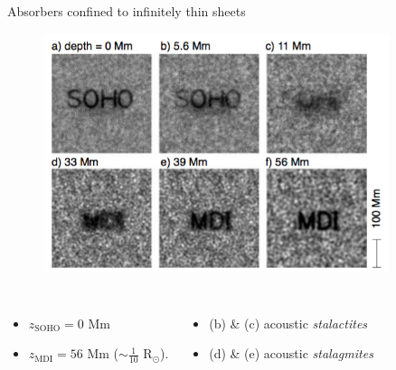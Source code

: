 \documentclass{beamer}
\begin{document}
\begin{frame}{Absorbers confined to infinitely thin sheets}
    \begin{figure}
        \includegraphics[width=0.9\textwidth]{fig_3.png}
    \end{figure}
    \vspace{-0.5cm}
    \begin{columns}
        \column{0.5\paperwidth}
            \begin{itemize}
                \item $z_{\textrm{SOHO}} = 0$ Mm
                \item $z_{\textrm{MDI}} = 56$ Mm
                    ($\sim \frac{1}{10}$ R$_{\odot}$).
            \end{itemize}
        \column{0.5\paperwidth}
            \begin{itemize}
                \item (b) \& (c) acoustic \emph{stalactites}
                \item (d) \& (e) acoustic \emph{stalagmites}
            \end{itemize}
    \end{columns}
\end{frame}
\end{document}
